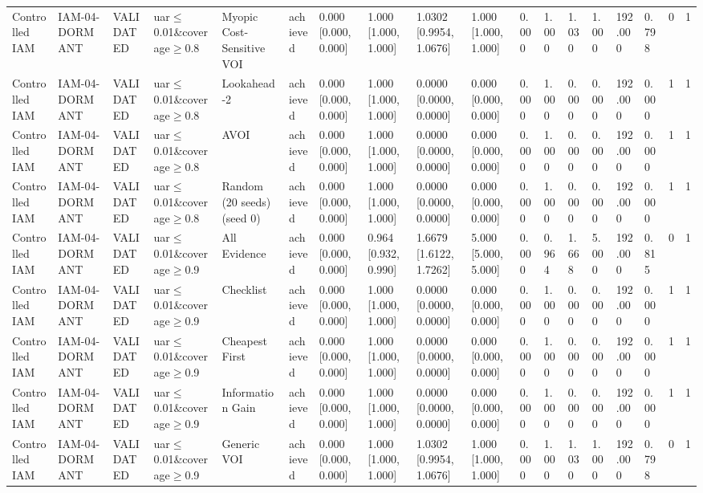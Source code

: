 \begin{table}[!ht]
{\begin{tabular}{llllllllllllllllll}
Controlled IAM & IAM-04-DORMANT & VALIDATED & uar$\le$0.01\&coverage$\ge$0.8 & Myopic Cost-Sensitive VOI & achieved & 0.000 [0.000, 0.000] & 1.000 [1.000, 1.000] & 1.0302 [0.9954, 1.0676] & 1.000 [1.000, 1.000] & 0.000 & 1.000 & 1.030 & 1.000 & 192.000 & 0.798 & 0 & 1 \\
Controlled IAM & IAM-04-DORMANT & VALIDATED & uar$\le$0.01\&coverage$\ge$0.8 & Lookahead-2 & achieved & 0.000 [0.000, 0.000] & 1.000 [1.000, 1.000] & 0.0000 [0.0000, 0.0000] & 0.000 [0.000, 0.000] & 0.000 & 1.000 & 0.000 & 0.000 & 192.000 & 0.000 & 1 & 1 \\
Controlled IAM & IAM-04-DORMANT & VALIDATED & uar$\le$0.01\&coverage$\ge$0.8 & AVOI & achieved & 0.000 [0.000, 0.000] & 1.000 [1.000, 1.000] & 0.0000 [0.0000, 0.0000] & 0.000 [0.000, 0.000] & 0.000 & 1.000 & 0.000 & 0.000 & 192.000 & 0.000 & 1 & 1 \\
Controlled IAM & IAM-04-DORMANT & VALIDATED & uar$\le$0.01\&coverage$\ge$0.8 & Random (20 seeds) (seed 0) & achieved & 0.000 [0.000, 0.000] & 1.000 [1.000, 1.000] & 0.0000 [0.0000, 0.0000] & 0.000 [0.000, 0.000] & 0.000 & 1.000 & 0.000 & 0.000 & 192.000 & 0.000 & 1 & 1 \\
Controlled IAM & IAM-04-DORMANT & VALIDATED & uar$\le$0.01\&coverage$\ge$0.9 & All Evidence & achieved & 0.000 [0.000, 0.000] & 0.964 [0.932, 0.990] & 1.6679 [1.6122, 1.7262] & 5.000 [5.000, 5.000] & 0.000 & 0.964 & 1.668 & 5.000 & 192.000 & 0.815 & 0 & 1 \\
Controlled IAM & IAM-04-DORMANT & VALIDATED & uar$\le$0.01\&coverage$\ge$0.9 & Checklist & achieved & 0.000 [0.000, 0.000] & 1.000 [1.000, 1.000] & 0.0000 [0.0000, 0.0000] & 0.000 [0.000, 0.000] & 0.000 & 1.000 & 0.000 & 0.000 & 192.000 & 0.000 & 1 & 1 \\
Controlled IAM & IAM-04-DORMANT & VALIDATED & uar$\le$0.01\&coverage$\ge$0.9 & Cheapest First & achieved & 0.000 [0.000, 0.000] & 1.000 [1.000, 1.000] & 0.0000 [0.0000, 0.0000] & 0.000 [0.000, 0.000] & 0.000 & 1.000 & 0.000 & 0.000 & 192.000 & 0.000 & 1 & 1 \\
Controlled IAM & IAM-04-DORMANT & VALIDATED & uar$\le$0.01\&coverage$\ge$0.9 & Information Gain & achieved & 0.000 [0.000, 0.000] & 1.000 [1.000, 1.000] & 0.0000 [0.0000, 0.0000] & 0.000 [0.000, 0.000] & 0.000 & 1.000 & 0.000 & 0.000 & 192.000 & 0.000 & 1 & 1 \\
Controlled IAM & IAM-04-DORMANT & VALIDATED & uar$\le$0.01\&coverage$\ge$0.9 & Generic VOI & achieved & 0.000 [0.000, 0.000] & 1.000 [1.000, 1.000] & 1.0302 [0.9954, 1.0676] & 1.000 [1.000, 1.000] & 0.000 & 1.000 & 1.030 & 1.000 & 192.000 & 0.798 & 0 & 1 \\

\end{tabular}}
\end{table}
